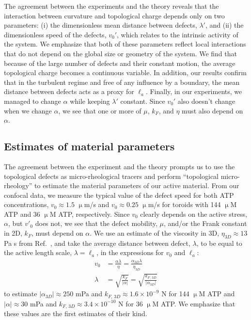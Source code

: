 The agreement between the experiments and the theory reveals that the interaction between curvature and topological charge depends only on two parameters: (i) the dimensionless mean distance between defects, $\lambda'$, and (ii) the dimensionless speed of the defects, $v_0'$, which relates to the intrinsic activity of the system.
We emphasize that both of these parameters reflect local interactions that do not depend on the global size or geometry of the system.
We find that because of the large number of defects and their constant motion, the average topological charge becomes a continuous variable.
In addition, our results confirm that in the turbulent regime and free of any influence by a boundary, the mean distance between defects acts as a
proxy for $\ell_a$.
Finally, in our experiments, we managed to change $\alpha$ while keeping $\lambda'$ constant.
Since $v_0'$ also doesn't change when we change $\alpha$, we see that one or more of $\mu$, $k_F$, and $\eta$ must also depend on $\alpha$.


\subsection{Estimates of material parameters}
The agreement between the experiment and the theory prompts us to use the topological defects as micro-rheological tracers and perform “topological micro-rheology” to estimate the material parameters of our active material.
From our confocal data, we measure the typical value of the defect speed for both ATP concentrations, $v_0 \approx 1.5$ $\upmu$m/s and $v_0 \approx 0.25$ $\upmu$m/s for toroids with 144 $\upmu$M ATP and 36 $\upmu$M ATP, respectively.
Since $v_0$ clearly depends on the active stress, $\alpha$, but $v'_0$ does not, we see that the defect mobility, $\mu$, and/or the Frank constant in 2D, $k_F$, must depend on $\alpha$.
We use an estimate of the viscosity in 3D, $\eta_{3D} \approx 13$ Pa s from Ref.~\cite{RN135, activeViscosity}, and take the average distance between defect, $\lambda$, to be equal to the active length scale, $\lambda = \ell_a$, in the expressions for $v_0$ and $\ell_a$:
\begin{align}
  v_0 &= \frac{\alpha \lambda}{\eta} = \frac{\alpha_{3D} \lambda}{\eta_{3D}} \\
  \lambda &  = \sqrt{\frac{k_F}{|\alpha|}} = \sqrt{\frac{k_{F,\,3D}}{|\alpha_{3D}|}}
\end{align}
 to estimate $|\alpha_{3D}| \approx  250$ mPa and $k_{F,\, 3D} \approx 1.6 \times 10^{-9}$ N for 144 $\upmu$M ATP and $|\alpha| \approx  30$ mPa and $k_{F,\, 3D} \approx 3.4 \times 10^{-10}$ N for 36 $\upmu$M ATP.
We emphasize that these values are the first estimates of their kind.

